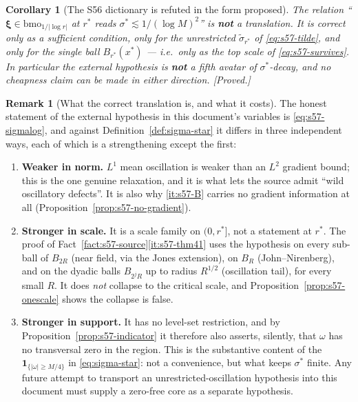 \documentclass[11pt]{article}
\newtheorem{corollary}[theorem]{Corollary}
\theoremstyle{definition}
\newtheorem{remark}[theorem]{Remark}
\theoremstyle{remark}
\begin{document}
\begin{corollary}[The S56 dictionary is refuted in the form proposed]
  \label{cor:s57-refuted}
  The relation ``$\boldsymbol\xi\in\mathrm{bmo}_{1/|\log r|}$ at $r^*$ reads
  $\sigma^*\lesssim1/(\log M)^2$'' is \textbf{not} a translation. It is
  correct only as a sufficient condition, only for the unrestricted
  $\tilde\sigma_{r^*}$ of \eqref{eq:s57-tilde}, and only for the single ball
  $B_{r^*}(x^*)$ --- i.e.\ only as the top scale of \eqref{eq:s57-survives}.
  In particular the external hypothesis is \textbf{not} a fifth avatar of
  $\sigma^*$-decay, and no cheapness claim can be made in either direction.
  \emph{[Proved.]}
\end{corollary}

\begin{remark}[What the correct translation is, and what it costs]
  \label{rem:s57-correct-translation}
  The honest statement of the external hypothesis in this document's
  variables is \eqref{eq:s57-sigmalog}, and against
  Definition~\ref{def:sigma-star} it differs in three independent ways, each
  of which is a strengthening except the first:
  \begin{enumerate}[label=\textup{(\alph*)},leftmargin=2.4em]
  \item \textbf{Weaker in norm.} $L^1$ mean oscillation is weaker than an
    $L^2$ gradient bound; this is the one genuine relaxation, and it is what
    lets the source admit ``wild oscillatory defects''. It is also why
    \ref{it:s57-B} carries no gradient information at all
    (Proposition~\ref{prop:s57-no-gradient}).
  \item \textbf{Stronger in scale.} It is a scale family on $(0,r^*]$, not a
    statement at $r^*$. The proof of
    Fact~\ref{fact:s57-source}\ref{it:s57-thm41} uses the hypothesis on every
    sub-ball of $B_{2R}$ (near field, via the Jones extension), on $B_R$
    (John--Nirenberg), and on the dyadic balls $B_{2^jR}$ up to radius
    $R^{1/2}$ (oscillation tail), for every small $R$. It does \emph{not}
    collapse to the critical scale, and
    Proposition~\ref{prop:s57-onescale} shows the collapse is false.
  \item \textbf{Stronger in support.} It has no level-set restriction, and by
    Proposition~\ref{prop:s57-indicator} it therefore also asserts, silently,
    that $\omega$ has no transversal zero in the region. This is the
    substantive content of the $\mathbf 1_{\{|\omega|\geq M/4\}}$ in
    \eqref{eq:sigma-star}: not a convenience, but what keeps $\sigma^*$
    finite. Any future attempt to transport an unrestricted-oscillation
    hypothesis into this document must supply a zero-free core as a separate
    hypothesis.
  \end{enumerate}
\end{remark}
\end{document}

